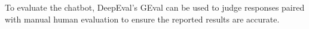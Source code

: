 To evaluate the chatbot, DeepEval's GEval can be used to judge responses paired with manual human evaluation to ensure the reported results 
are accurate. 

\nocite{IBMAIDef}
\nocite{UXDict}
\nocite{ICOAIDef}
\nocite{IBMGenAI}
\nocite{MITGenAI}
\nocite{CloudflareLLM}
\nocite{IBMNLP}
\nocite{aws_what_nodate}
\nocite{databricks_retrieval_2023}
\nocite{elastic_what_nodate}
\nocite{confident_ai_llm_nodate}
\nocite{metaFaissLibraryEfficient2017}
